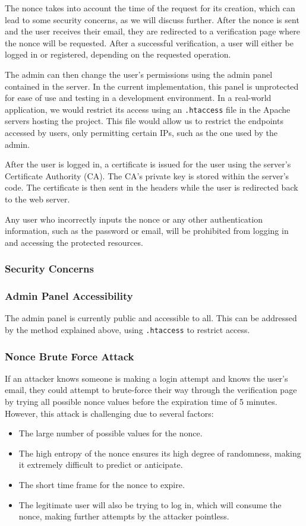\documentclass[10pt]{article}
\begin{document}
The nonce takes into account the time of the request for its creation, which can lead to some security concerns, as we will discuss further. After the nonce is sent and the user receives their email, they are redirected to a verification page where the nonce will be requested. After a successful verification, a user will either be logged in or registered, depending on the requested operation.

The admin can then change the user's permissions using the admin panel contained in the server. In the current implementation, this panel is unprotected for ease of use and testing in a development environment. In a real-world application, we would restrict its access using an \texttt{.htaccess} file in the Apache servers hosting the project. This file would allow us to restrict the endpoints accessed by users, only permitting certain IPs, such as the one used by the admin.

After the user is logged in, a certificate is issued for the user using the server's Certificate Authority (CA). The CA's private key is stored within the server's code. The certificate is then sent in the headers while the user is redirected back to the web server.

Any user who incorrectly inputs the nonce or any other authentication information, such as the password or email, will be prohibited from logging in and accessing the protected resources.

\subsubsection{Security Concerns}

\subsubsection*{Admin Panel Accessibility}

The admin panel is currently public and accessible to all. This can be addressed by the method explained above, using \texttt{.htaccess} to restrict access.

\subsubsection*{Nonce Brute Force Attack}
If an attacker knows someone is making a login attempt and knows the user's email, they could attempt to brute-force their way through the verification page by trying all possible nonce values before the expiration time of 5 minutes. However, this attack is challenging due to several factors:
\begin{itemize}
    \item The large number of possible values for the nonce.
    \item The high entropy of the nonce ensures its high degree of randomness, making it extremely difficult to predict or anticipate.
    \item The short time frame for the nonce to expire.
    \item The legitimate user will also be trying to log in, which will consume the nonce, making further attempts by the attacker pointless.
\end{itemize}
\end{document}
